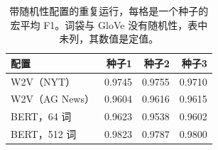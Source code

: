 \begin{table}[t]
\centering
\footnotesize
\caption{带随机性配置的重复运行，每格是一个种子的宏平均 F1。词袋与 GloVe 没有随机性，表中未列，其数值是定值。}
\label{tab:repeats}
\begin{tabular}{lrrr}
\toprule
配置 & 种子1 & 种子2 & 种子3 \\
\midrule
W2V（NYT） & 0.9745 & 0.9755 & 0.9710 \\
W2V（AG News） & 0.9604 & 0.9616 & 0.9615 \\
BERT，64 词 & 0.9623 & 0.9538 & 0.9602 \\
BERT，512 词 & 0.9823 & 0.9787 & 0.9800 \\
\bottomrule
\end{tabular}
\end{table}
